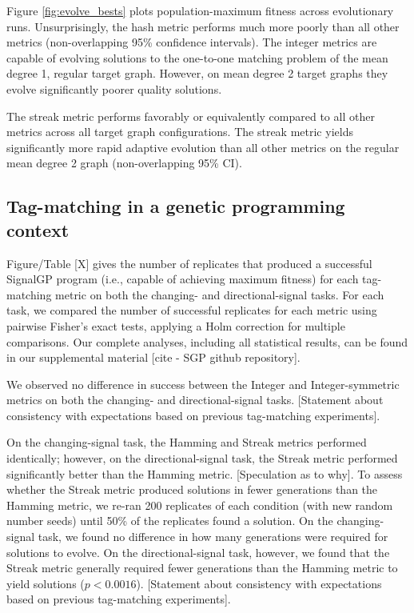 

Figure \ref{fig:evolve_bests} plots population-maximum fitness across evolutionary runs.
Unsurprisingly, the hash metric performs much more poorly than all other metrics (non-overlapping 95\% confidence intervals).
The integer metrics are capable of evolving solutions to the one-to-one matching problem of the mean degree 1, regular target graph.
However, on mean degree 2 target graphs they evolve significantly poorer quality solutions.

The streak metric performs favorably or equivalently compared to all other metrics across all target graph configurations.
The streak metric yields significantly more rapid adaptive evolution than all other metrics on the regular mean degree 2 graph (non-overlapping 95\% CI).

\subsection{Tag-matching in a genetic programming context}



Figure/Table [X] gives the number of replicates that produced a successful SignalGP program (i.e., capable
of achieving maximum fitness) for each tag-matching metric on both the changing- and directional-signal
tasks.
For each task, we compared the number of successful replicates for each metric using pairwise Fisher's
exact tests, applying a Holm correction for multiple comparisons.
Our complete analyses, including all statistical results, can be found in our supplemental material
[cite - SGP github repository].

We observed no difference in success between the Integer and Integer-symmetric metrics on both the
changing- and directional-signal tasks.
[Statement about consistency with expectations based on previous tag-matching experiments].

On the changing-signal task, the Hamming and Streak metrics performed identically; however, on the directional-signal
task, the Streak metric performed significantly better than the Hamming metric.
[Speculation as to why].
To assess whether the Streak metric produced solutions in fewer generations than the Hamming metric,
we re-ran 200 replicates of each condition (with new random number seeds) until 50\% of the replicates
found a solution.
On the changing-signal task, we found no difference in how many generations were required for solutions
to evolve.
On the directional-signal task, however, we found that the Streak metric generally required fewer generations
than the Hamming metric to yield solutions ($p < 0.0016$).
[Statement about consistency with expectations based on previous tag-matching experiments].

